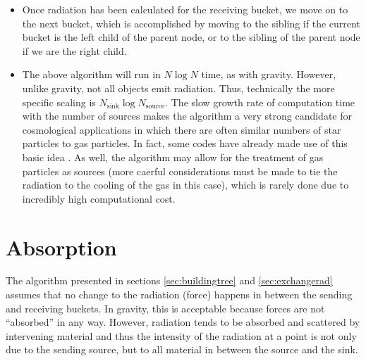 \begin{itemize}
\begin{enumerate}
	\end{enumerate}
	\item Once radiation has been calculated for the receiving bucket, we move on to the next bucket, which is accomplished by moving to the sibling if the current bucket is the left child of the parent node, or to the sibling of the parent node if we are the right child.
	\item The above algorithm will run in $N\log{N}$ time, as with gravity. However, unlike gravity, not all objects emit radiation. Thus, technically the more specific scaling is $N_{\mbox{sink}}\log{N_{\mbox{source}}}$. The slow growth rate of computation time with the number of sources makes the algorithm a very strong candidate for cosmological applications in which there are often similar numbers of star particles to gas particles. In fact, some codes have already made use of this basic idea \citep{gnedinAbel99,hopkins, kannanEt14}. As well, the algorithm may allow for the treatment of gas particles as sources (more caerful considerations must be made to tie the radiation to the cooling of the gas in this case), which is rarely done due to incredibly high computational cost.
\end{itemize}

\section{Absorption}
\label{sec:absorption}

The algorithm presented in sections \ref{sec:buildingtree} and \ref{sec:exchangerad} assumes that no change to the radiation (force) happens in between the sending and receiving buckets. In gravity, this is acceptable because forces are not ``absorbed'' in any way. However, radiation tends to be absorbed and scattered by intervening material and thus the intensity of the radiation at a point is not only due to the sending source, but to all material in between the source and the sink.

